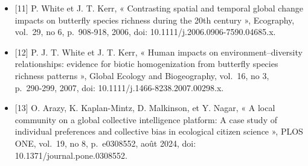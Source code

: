 \documentclass[preprint, 3p,
authoryear]{elsarticle} %
\begin{document}
\begin{itemize}
  Estimates of Taxonomic Effort », Systematic Biology, vol.~61, no 5,
  p.~871, oct. 2012, doi: 10.1093/sysbio/syr080.
\item
  {[}11{]} P. White et J. T. Kerr, « Contrasting spatial and temporal
  global change impacts on butterfly species richness during the 20th
  century », Ecography, vol.~29, no 6, p.~908‑918, 2006, doi:
  10.1111/j.2006.0906-7590.04685.x.
\item
  {[}12{]} P. J. T. White et J. T. Kerr, « Human impacts on
  environment--diversity relationships: evidence for biotic
  homogenization from butterfly species richness patterns », Global
  Ecology and Biogeography, vol.~16, no 3, p.~290‑299, 2007, doi:
  10.1111/j.1466-8238.2007.00298.x.
\item
  {[}13{]} O. Arazy, K. Kaplan-Mintz, D. Malkinson, et Y. Nagar, « A
  local community on a global collective intelligence platform: A case
  study of individual preferences and collective bias in ecological
  citizen science », PLOS ONE, vol.~19, no 8, p.~e0308552, août 2024,
  doi: 10.1371/journal.pone.0308552.
\end{itemize}


\end{document}
